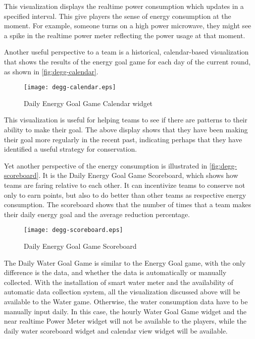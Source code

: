 This visualization displays the realtime power consumption which updates in a specified interval. This give players the sense of energy consumption at the moment. For example, someone turns on a high power microwave, they might see a spike in the realtime power meter reflecting the power usage at that moment.

Another useful perspective to a team is a historical, calendar-based visualization that shows the results of the energy goal game for each day of the current round, as shown in \autoref{fig:degg-calendar}.

\begin{figure}[!ht]
  \center
  \texttt{[image: degg-calendar.eps]}
  \caption{Daily Energy Goal Game Calendar widget}
  \label{fig:degg-calendar}
\end{figure}

This visualization is useful for helping teams to see if there are patterns to their ability to make their goal. The above display shows that they have been making their goal more regularly in the recent past, indicating perhaps that they have identified a useful strategy for conservation.

Yet another perspective of the energy consumption is illustrated in \autoref{fig:degg-scoreboard}. It is the Daily Energy Goal Game Scoreboard, which shows how teams are faring relative to each other. It can incentivize teams to conserve not only to earn points, but also to do better than other teams as respective energy consumption. The scoreboard shows that the number of times that a team makes their daily energy goal and the average reduction percentage.

\begin{figure}[!ht]
  \center
  \texttt{[image: degg-scoreboard.eps]}
  \caption{Daily Energy Goal Game Scoreboard}
  \label{fig:degg-scoreboard}
\end{figure}

The Daily Water Goal Game is similar to the Energy Goal game, with the only difference is the data, and whether the data is automatically or manually collected. With the installation of smart water meter and the availability of automatic data collection system, all the visualization discussed above will be available to the Water game. Otherwise, the water consumption data have to be manually input daily. In this case, the hourly Water Goal Game widget and the near realtime Power Meter widget will not be available to the players, while the daily water scoreboard widget and calendar view widget will be available.

